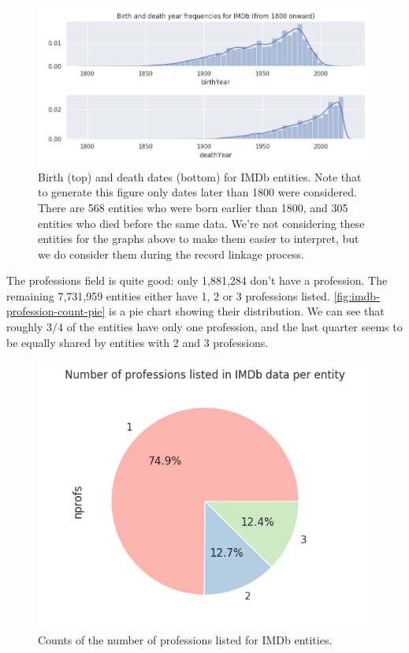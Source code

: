 \documentclass[epsfig,a4paper,11pt,titlepage,twoside,openany]{book}
\begin{document}
\begin{figure}[]
  \centering \includegraphics[width=.9\textwidth]{birth_and_death_frequencies_imdb}
  \caption{Birth (top) and death dates (bottom) for IMDb entities. Note that to generate this figure only dates later than 1800 were considered. There are 568 entities who were born earlier than 1800, and 305 entities who died before the same data. We're not considering these entities for the graphs above to make them easier to interpret, but we do consider them during the record linkage process.}
  \label{fig:imdb-years-distplot}
\end{figure}

The professions field is quite good: only 1,881,284 don't have a profession. The remaining 7,731,959 entities either have 1, 2 or 3 professions listed. \autoref{fig:imdb-profession-count-pie} is a pie chart showing their distribution. We can see that roughly $3/4$ of the entities have only one profession, and the last quarter seems to be equally shared by entities with 2 and 3 professions.

\begin{figure}[]
  \centering \includegraphics[width=.6\textwidth]{profession_counts_imdb}
  \caption{Counts of the number of professions listed for IMDb entities.}
  \label{fig:imdb-profession-count-pie}
\end{figure}
\end{document}

